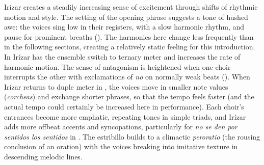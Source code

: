 Irízar creates a steadily increasing sense of excitement through shifts of
rhythmic motion and style.
The setting of the opening phrase suggests a tone of hushed awe: the voices sing
low in their registers, with a slow harmonic rhythm, and pause for prominent
breaths ().
The harmonies here change less frequently than in the following sections,
creating a relatively static feeling for this introduction.
In  Irízar has the ensemble switch to ternary meter and increases
the rate of harmonic motion.
The sense of antagonism is heightened when one choir interrupts the other with
exclamations of \emph{no} on normally weak beats ().
When Irízar returns to duple meter in , the voices move in smaller
note values (\emph{corcheas}) and exchange shorter phrases, so that the tempo
feels faster (and the actual tempo could certainly be increased here in
performance).
Each choir's entrances become more emphatic, repeating tones in simple triads,
and Irízar adds more offbeat accents and syncopations, particularly for \emph{no
se den por sentidos los sentidos} in .
The estribillo builds to a climactic \emph{peroratio} (the rousing conclusion of
an oration) with the voices breaking into imitative texture in descending
melodic lines.

